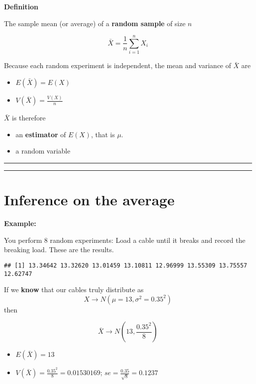 \documentclass[
]{book}
\providecommand{\tightlist}{%
  \setlength{\itemsep}{0pt}\setlength{\parskip}{0pt}}
\begin{document}
\textbf{Definition}

The sample mean (or average) of a \textbf{random sample} of size \(n\)

\[\bar{X}=\frac{1}{n}\sum_{i=1}^n X_i\]

Because each random experiment is independent, the mean and variance of \(\bar{X}\) are

\begin{itemize}
\tightlist
\item
  \(E(\bar{X})=E(X)\)
\item
  \(V(\bar{X})=\frac{V(X)}{n}\)
\end{itemize}

\(\bar{X}\) is therefore

\begin{itemize}
\item
  an \textbf{estimator} of \(E(X)\), that is \(\mu\).
\item
  a random variable
\end{itemize}

\begin{center}\rule{0.5\linewidth}{0.5pt}\end{center}

\begin{center}\rule{0.5\linewidth}{0.5pt}\end{center}

\hypertarget{inference-on-the-average-1}{%
\section{Inference on the average}\label{inference-on-the-average-1}}

\textbf{Example:}

You perform \(8\) random experiments: Load a cable until it breaks and record the breaking load. These are the results.

\begin{verbatim}
## [1] 13.34642 13.32620 13.01459 13.10811 12.96999 13.55309 13.75557 12.62747
\end{verbatim}

If we \textbf{know} that our cables truly distribute as \[X \rightarrow N(\mu=13, \sigma^2=0.35^2)\] then

\[\bar{X} \rightarrow N(13, \frac{0.35^2}{8})\]

\begin{itemize}
\tightlist
\item
  \(E(\bar{X})=13\)
\item
  \(V(\bar{X})=\frac{0.35^2}{8}=0.01530169\); \(se=\frac{0.35}{\sqrt{8}}=0.1237\)
\end{itemize}
\end{document}
